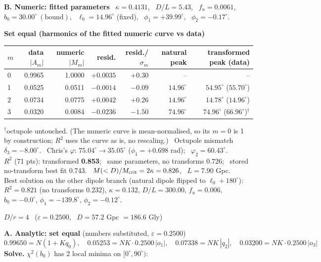 \documentclass[10pt]{article}
\begin{document}
\medskip\textbf{B. Numeric: fitted parameters} \ $\kappa=0.4131$, \ $D/L=5.43$, \ $f_u=0.0061$, \ $b_0=30.00^\circ\ (\text{bound})$, \ $\ell_0=14.96^\circ$ (fixed), \ $\phi_1=+39.99^\circ$, \ $\phi_2=-0.17^\circ$.

\textbf{Set equal (harmonics of the fitted numeric curve vs data)}
\begin{center}\small\begin{tabular}{lrrrrrr}\toprule
$m$ & data $|A_m|$ & numeric $|M_m|$ & resid. & resid./$\sigma_m$ & natural peak & transformed peak (data)\\\midrule
0 & 0.9965 & 1.0000 & $+0.0035$ & $+0.30$ & -- & --\\
1 & 0.0525 & 0.0511 & $-0.0014$ & $-0.09$ & $14.96^\circ$ & $54.95^\circ$ ($55.70^\circ$)\\
2 & 0.0734 & 0.0775 & $+0.0042$ & $+0.26$ & $14.96^\circ$ & $14.78^\circ$ ($14.96^\circ$)\\
3 & 0.0320 & 0.0084 & $-0.0236$ & $-1.50$ & $74.96^\circ$ & $74.96^\circ$ ($66.96^\circ$)$^\dagger$\\
\bottomrule\end{tabular}\end{center}
$^\dagger$octupole untouched. (The numeric curve is mean-normalised, so its $m{=}0$ is 1 by construction; $R^2$ uses the curve as is, no rescaling.) \ Octupole mismatch $\delta_3=-8.00^\circ$. \ Chris's $\varphi$: $75.04^\circ\to35.05^\circ$ ($\phi_1=+0.698$ rad); \ $\varphi_2=60.43^\circ$.\\
$R^2$ (71 pts): transformed \textbf{0.853}; \ same parameters, no transforms $0.726$; \ stored no-transform best fit 0.743. \ $M(<D)/M_{\rm crit}=2\kappa=0.826$, \ $L=7.90$ Gpc.
\\ Best solution on the other dipole branch (natural dipole flipped to $\ell_0+180^\circ$): $R^2=0.821$ (no transforms $0.232$), $\kappa=0.132$, $D/L=300.00$, $f_u=0.006$, $b_0=-0.0^\circ$, $\phi_1=-139.8^\circ$, $\phi_2=-0.12^\circ$.

\clearpage
{\large\bfseries\boldmath $D/r=4$} \ ($\varepsilon=0.2500$, \ $D=57.2$ Gpc $=186.6$ Gly)

\textbf{A. Analytic: set equal} (numbers substituted, $\varepsilon=0.2500$)
\[ 0.99650=N(1+Kq_0),\quad 0.05253=NK\cdot0.2500\,|o_1|,\quad 0.07338=NK\,|q_2|,\quad 0.03200=NK\cdot0.2500\,|o_3| \]
\textbf{Solve.} $\chi^2(b_0)$ has 2 local minima on $[0^\circ,90^\circ)$:
\end{document}
